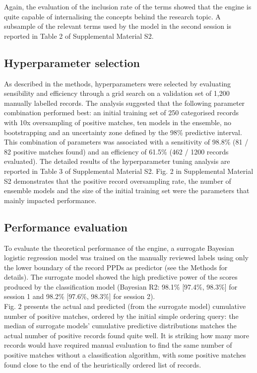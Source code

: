 \documentclass{article}
\begin{document}
Again, the evaluation of the inclusion rate of the terms showed that the
engine is quite capable of internalising the concepts behind the
research topic. A subsample of the relevant terms used by the model in
the second session is reported in Table 2 of Supplemental Material S2.

\hypertarget{hyperparameter-selection}{%
\subsection{Hyperparameter selection}\label{hyperparameter-selection}}

As described in the methods, hyperparameters were selected by evaluating
sensibility and efficiency through a grid search on a validation set of
1,200 manually labelled records. The analysis suggested that the
following parameter combination performed best: an initial training set
of 250 categorised records with 10x oversampling of positive matches,
ten models in the ensemble, no bootstrapping and an uncertainty zone
defined by the 98\% predictive interval. This combination of parameters
was associated with a sensitivity of 98.8\% (81 / 82 positive matches
found) and an efficiency of 61.5\% (462 / 1200 records evaluated). The
detailed results of the hyperparameter tuning analysis are reported in
Table 3 of Supplemental Material S2. Fig. 2 in Supplemental Material S2
demonstrates that the positive record oversampling rate, the number of
ensemble models and the size of the initial training set were the
parameters that mainly impacted performance.

\hypertarget{performance-evaluation-1}{%
\subsection{Performance evaluation}\label{performance-evaluation-1}}

To evaluate the theoretical performance of the engine, a surrogate
Bayesian logistic regression model was trained on the manually reviewed
labels using only the lower boundary of the record PPDs as predictor
(see the Methods for details). The surrogate model showed the high
predictive power of the scores produced by the classification model
(Bayesian R2: 98.1\% {[}97.4\%, 98.3\%{]} for session 1 and 98.2\%
{[}97.6\%, 98.3\%{]} for session 2).\\

Fig. 2 presents the actual and predicted (from the surrogate model)
cumulative number of positive matches, ordered by the initial simple
ordering query: the median of surrogate models' cumulative predictive
distributions matches the actual number of positive records found quite
well. It is striking how many more records would have required manual
evaluation to find the same number of positive matches without a
classification algorithm, with some positive matches found close to the
end of the heuristically ordered list of records.\\
\end{document}
